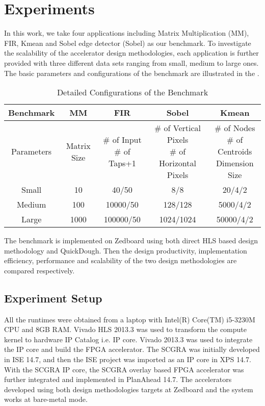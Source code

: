 \section{Experiments}\label{sec:experiments}
In this work, we take four applications including Matrix Multiplication (MM), FIR, Kmean and Sobel edge detector (Sobel) as our benchmark. To investigate the scalability of the accelerator design methodologies, each application is further provided with three different data sets ranging from small, medium to large ones. The basic parameters and configurations of the benchmark are illustrated in the .

\begin{table*}[htpb]
  \caption{Detailed Configurations of the Benchmark}
  \label{tab:benchmark-config}
  \centering
  \begin{tabular}{c|c|c|c|c}
  \hline
  Benchmark & MM & FIR & Sobel & Kmean \\ \hline
  Parameters & Matrix Size & \tabincell{c}{\# of Input \\ \# of Taps+1} & \tabincell{c}{ \# of Vertical Pixels \\ \# of Horizontal Pixels} & \tabincell{c}{\# of Nodes \\ \# of Centroids \\ Dimension Size} \\ \hline
  Small & 10 & 40/50 & 8/8 & 20/4/2 \\ \hline
  Medium & 100 & 10000/50 & 128/128 & 5000/4/2  \\ \hline
  Large & 1000 & 100000/50 & 1024/1024 & 50000/4/2 \\ \hline
  \end{tabular}
\end{table*}

The benchmark is implemented on Zedboard using both direct HLS based design methodology and QuickDough. Then the design productivity, implementation efficiency, performance and scalability of the two design methodologies are compared respectively.

\subsection{Experiment Setup}
All the runtimes were obtained from a laptop with Intel(R) Core(TM) i5-3230M CPU and 8GB RAM. Vivado HLS 2013.3 was used to transform the compute kernel to hardware IP Catalog i.e. IP core. Vivado 2013.3 was used to integrate the IP core and build the FPGA accelerator. The SCGRA was initially developed in ISE 14.7, and then the ISE project was imported as an IP core in XPS 14.7. With the SCGRA IP core, the SCGRA overlay based FPGA accelerator was further integrated and implemented in PlanAhead 14.7. The accelerators developed using both design methodologies targets at Zedboard \cite{zedboard} and the system works at bare-metal mode.

